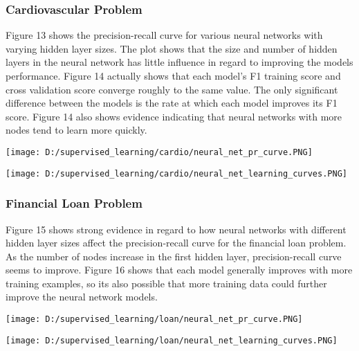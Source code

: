 \documentclass[10pt,journal,compsoc]{IEEEtran}
\begin{document}
\subsubsection{Cardiovascular Problem}
Figure 13 shows the precision-recall curve for various neural networks with varying hidden layer sizes. The plot shows that the size and number of hidden layers in the neural network has little influence in regard to improving the models performance. Figure 14 actually shows that each model's F1 training score and cross validation score converge roughly to the same value. The only significant difference between the models is the rate at which each model improves its F1 score. Figure 14 also shows evidence indicating that neural networks with more nodes tend to learn more quickly.
\begin{center}
	\texttt{[image: D:/supervised\_learning/cardio/neural\_net\_pr\_curve.PNG]}
\end{center}
\begin{center}
	\texttt{[image: D:/supervised\_learning/cardio/neural\_net\_learning\_curves.PNG]}
\end{center}
\subsubsection{Financial Loan Problem}
Figure 15 shows strong evidence in regard to how neural networks with different hidden layer sizes affect the precision-recall curve for the financial loan problem. As the number of nodes increase in the first hidden layer, precision-recall curve seems to improve. Figure 16 shows that each model generally improves with more training examples, so its also possible that more training data could further improve the neural network models.
\begin{center}
	\texttt{[image: D:/supervised\_learning/loan/neural\_net\_pr\_curve.PNG]}
\end{center}
\begin{center}
	\texttt{[image: D:/supervised\_learning/loan/neural\_net\_learning\_curves.PNG]}
\end{center}
\end{document}
